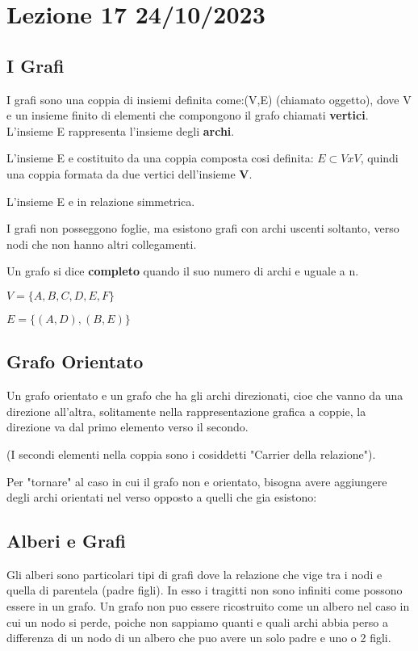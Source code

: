 \section{Lezione 17 24/10/2023}

\subsection{I Grafi}
I grafi sono una coppia di insiemi definita come:(V,E) (chiamato oggetto), dove V e un insieme finito di elementi che compongono il grafo chiamati \textbf{vertici}. L'insieme E rappresenta l'insieme degli \textbf{archi}.

L'insieme E e costituito da una coppia composta cosi definita: $E \subset V x V$, quindi una coppia formata da due vertici dell'insieme \textbf{V}.

L'insieme E e in relazione simmetrica. 

I  grafi non posseggono foglie, ma esistono grafi con archi uscenti soltanto, verso nodi che non hanno altri collegamenti.

Un grafo si dice \textbf{completo} quando il suo numero di archi e uguale a n.


$V = \{A,B,C,D,E,F\}$

$E = \{(A,D), (B,E)\}$

\subsection{Grafo Orientato}
Un grafo orientato e un grafo che ha gli archi direzionati, cioe che vanno da una direzione all'altra, solitamente nella rappresentazione grafica a coppie, la direzione va dal primo elemento verso il secondo.

(I secondi elementi nella coppia sono i cosiddetti "Carrier della relazione").


Per "tornare" al caso in cui il grafo non e orientato, bisogna avere aggiungere degli archi orientati nel verso opposto a quelli che gia esistono:


\subsection{Alberi e Grafi}

Gli alberi sono particolari tipi di grafi dove la relazione che vige tra i nodi e quella di parentela (padre figli). In esso i tragitti non sono infiniti come possono essere in un grafo.
Un grafo non puo essere ricostruito come un albero nel caso in cui un nodo si perde, poiche non sappiamo quanti e quali archi abbia perso a differenza di un nodo di un albero che puo avere un solo padre e uno o 2 figli.

